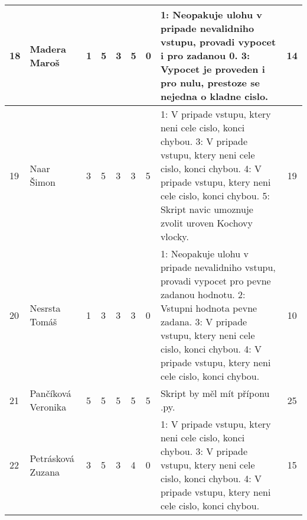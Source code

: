 \documentclass[landscape, 12pt]{article}
\begin{document}
\begin{longtable}{|l l | C{0.7cm} | C{0.7cm} | C{0.7cm} | C{0.7cm} | C{0.7cm} | L{15cm} |c|}
  18 & Madera Maroš       &       1 &       5 &       3 &       5 &       0 & 1: Neopakuje ulohu v pripade nevalidniho vstupu, provadi vypocet i pro zadanou 0. 3: Vypocet je proveden i pro nulu, prestoze se nejedna o kladne cislo.                                                                                                                                                                                                                                &       14 \\
\hline

  19 & Naar Šimon         &       3 &       5 &       3 &       3 &       5 & 1: V pripade vstupu, ktery neni cele cislo, konci chybou. 3: V pripade vstupu, ktery neni cele cislo, konci chybou. 4: V pripade vstupu, ktery neni cele cislo, konci chybou. 5: Skript navic umoznuje zvolit uroven Kochovy vlocky.                                                                                                                                                                      &       19 \\
\hline

  20 & Nesrsta Tomáš      &       1 &       3 &       3 &       3 &       0 & 1: Neopakuje ulohu v pripade nevalidniho vstupu, provadi vypocet pro pevne zadanou hodnotu. 2: Vstupni hodnota pevne zadana. 3: V pripade vstupu, ktery neni cele cislo, konci chybou. 4: V pripade vstupu, ktery neni cele cislo, konci chybou.                                                                                                                                                    &       10 \\
\hline

  21 & Pančíková Veronika &       5 &       5 &       5 &       5 &       5 & Skript by měl mít příponu .py.                                                                                                                                                                                                                                                                                                                                                          &       25 \\
\hline

  22 & Petrásková Zuzana  &       3 &       5 &       3 &       4 &       0 & 1: V pripade vstupu, ktery neni cele cislo, konci chybou. 3: V pripade vstupu, ktery neni cele cislo, konci chybou. 4: V pripade vstupu, ktery neni cele cislo, konci chybou.                                                                                                                                                                                                                             &       15 \\
\hline


\end{longtable}
\end{document}
